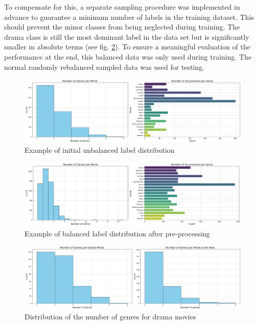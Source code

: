 \documentclass[a4paper, 11pt]{article}
\begin{document}
    To compensate for this, a separate sampling procedure was implemented in advance to guarantee a minimum number of labels in the training dataset. This should prevent the minor classes from being neglected during training. The drama class is still the most dominant label in the data set but is significantly smaller in absolute terms (see fig. \ref{fig:balanced_data}). To ensure a meaningful evaluation of the performance at the end, this balanced data was only used during training. The normal randomly rebalanced sampled data was used for testing.\\
    \begin{figure}[h!]
        \includegraphics[width=\linewidth]{imgs/unbalanced_test_data.png}
        \caption{Example of initial unbalanced label distribution}
        \label{fig:unbalanced_data}
    \end{figure}
    \begin{figure}[h!]
        \includegraphics[width=\linewidth]{imgs/balanced_train_data.png}
        \caption{Example of balanced label distribution after pre-processing}
        \label{fig:balanced_data}
    \end{figure}
    \begin{figure}[h!]
        \includegraphics[width=\linewidth]{imgs/drama_distribution.png}
        \caption{Distribution of the number of genres for drama movies}
        \label{fig:drama_distribution}
    \end{figure}\\
\end{document}
